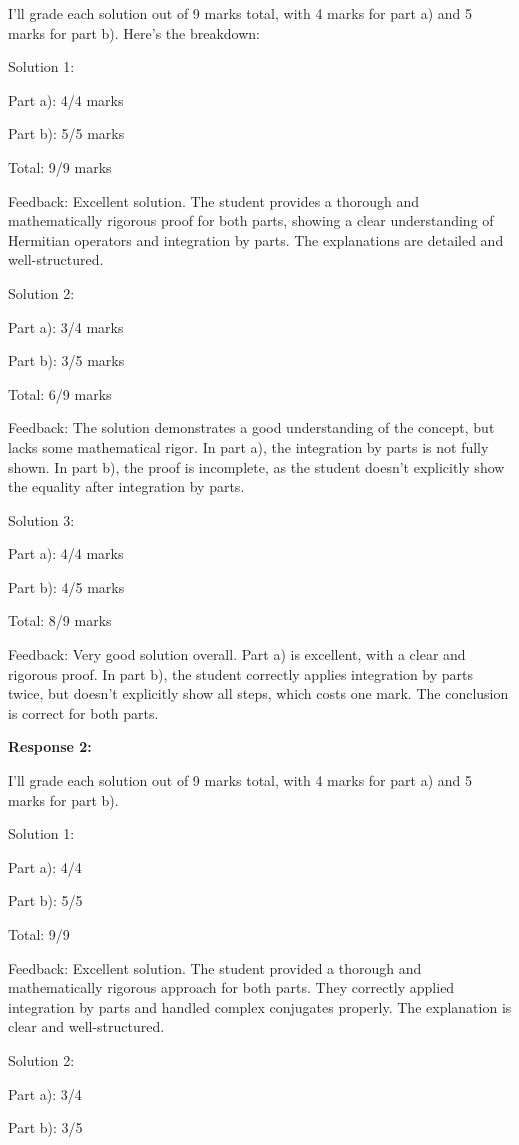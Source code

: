 \documentclass[a4paper,11pt]{article}
\begin{document}
I'll grade each solution out of 9 marks total, with 4 marks for part a) and 5 marks for part b). Here's the breakdown:

Solution 1:

Part a): 4/4 marks

Part b): 5/5 marks

Total: 9/9 marks

Feedback: Excellent solution. The student provides a thorough and mathematically rigorous proof for both parts, showing a clear understanding of Hermitian operators and integration by parts. The explanations are detailed and well-structured.

Solution 2:

Part a): 3/4 marks

Part b): 3/5 marks

Total: 6/9 marks

Feedback: The solution demonstrates a good understanding of the concept, but lacks some mathematical rigor. In part a), the integration by parts is not fully shown. In part b), the proof is incomplete, as the student doesn't explicitly show the equality after integration by parts.

Solution 3:

Part a): 4/4 marks

Part b): 4/5 marks

Total: 8/9 marks

Feedback: Very good solution overall. Part a) is excellent, with a clear and rigorous proof. In part b), the student correctly applies integration by parts twice, but doesn't explicitly show all steps, which costs one mark. The conclusion is correct for both parts.

\bigskip
\textbf{Response 2:}

I'll grade each solution out of 9 marks total, with 4 marks for part a) and 5 marks for part b).

Solution 1:

Part a): 4/4

Part b): 5/5

Total: 9/9

Feedback: Excellent solution. The student provided a thorough and mathematically rigorous approach for both parts. They correctly applied integration by parts and handled complex conjugates properly. The explanation is clear and well-structured.

Solution 2:

Part a): 3/4

Part b): 3/5
\end{document}
